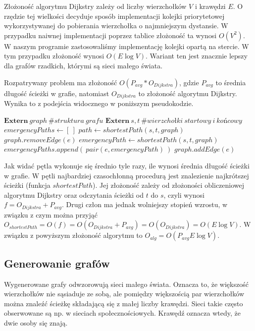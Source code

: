 \documentclass[a4paper, 12pt]{article}
\begin{document}
Złożoność algorytmu Dijkstry zależy od liczby wierzchołków $V$ i krawędzi $E$. O rzędzie tej wielkości decyduje sposób implementacji kolejki priorytetowej wykorzystywanej do pobierania wierzchołka o najmniejszym dystansie. W przypadku naiwnej implementacji poprzez tablice złożoność ta wynosi $O(V^2)$. W naszym programie zastosowaliśmy implementację kolejki opartą na stercie. W tym przypadku złożoność wynosi $O(E \log V)$. Wariant ten jest znacznie lepszy dla grafów rzadkich, którymi są sieci małego świata.

Rozpatrywany problem ma złożoność $O(P_{avg}*O_{Dijkstra})$, gdzie $P_{avg}$ to średnia długość ścieżki w grafie, natomiast $O_{Dijkstra}$ to złożoność algorytmu Dijkstry. Wynika to z podejścia widocznego w poniższym pseudokodzie.
\begin{algorithmic}
\State $\mathbf{Extern}\ graph\ \mathit{\# struktura\ grafu}$
\State $\mathbf{Extern}\ s, t\ \mathit{\# wierzchołki\ startowy\ i\ końcowy}$
\State
\State $emergencyPaths \gets [\ ]$
 \State $path \gets shortestPath(s, t, graph)$
\State $graph.removeEdge(e)$
\State $emergencyPath \gets shortestPath(s, t, graph)$
\State $emergencyPaths.append(\ pair(e, emergencyPath)\ )$
\State $graph.addEdge(e)$
\EndFor
\State {}
\end{algorithmic}
Jak widać pętla wykonuje się średnio tyle razy, ile wynosi średnia długość ścieżki w grafie. W pętli najbardziej czasochłonną procedurą jest znalezienie najkrótszej ścieżki (funkcja $shortestPath$). Jej złożoność zależy od złożoności obliczeniowej algorytmu Dijkstry oraz odczytania ścieżki od $t$ do $s$, czyli wynosi $f = O_{Dijkstra}+ P_{avg}$. Drugi człon ma jednak wolniejszy stopień wzrostu, w związku z czym można przyjąć $O_{shortestPath}=O(f)=O(O_{Dijkstra}+ P_{avg}) = O(O_{Dijkstra}) = O(E \log V)$.
W związku z powyższym złożoność algorytmu to $O_{alg} = O( P_{avg}E \log V)$.

\subsection{Generowanie grafów}
\label{generator}
Wygenerowane grafy odwzorowują sieci małego świata\cite{amaral2000classes}. Oznacza to, że większość wierzchołków nie sąsiaduje ze sobą, ale pomiędzy większością par wierzchołków można znaleźć ścieżkę składającą się z małej liczby krawędzi. Sieci takie często obserwowane są np. w sieciach społecznościowych. Krawędź oznacza wtedy, że dwie osoby się znają.
\end{document}

